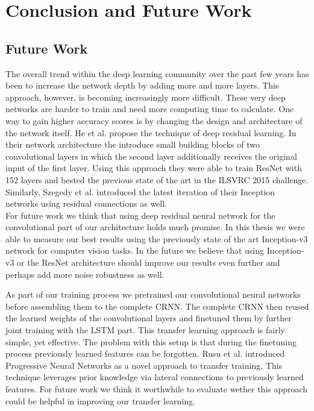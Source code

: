 \section{Conclusion and Future Work}
\label{sec:summary}

\subsection{Future Work}
The overall trend within the deep learning community over the past few years has been to increase the network depth by adding more and more layers. This approach, however, is becoming increasingly more difficult. These very deep networks are harder to train and need more computing time to calculate. One way to gain higher accuracy scores is by changing the design and architecture of the network itself. He et al. propose the technique of deep residual learning\cite{he2016deep}. In their network architecture the introduce small building blocks of two convolutional layers in which the second layer additionally receives the original input of the first layer. \cite{he2016deep} Using this approach they were able to train ResNet with 152 layers and bested the previous state of the art in the ILSVRC 2015 challenge. Similarly, Szegedy et al. introduced the latest iteration of their Inception networks using residual connections\cite{szegedy2016inception} as well.\\
For future work we think that using deep residual neural network for the convolutional part of our architecture holds much promise. In this thesis we were able to measure our best results using the previously state of the art Inception-v3 network for computer vision tasks. In the future we believe that using Inception-v3 or the ResNet architecture should improve our results even further and perhaps add more noise robustness as well.

As part of our training process we pretrained our convolutional neural networks before assembling them to the complete CRNN. The complete CRNN then reused the learned weights of the convolutional layers and finetuned them by further joint training with the LSTM part. This transfer learning approach is fairly simple, yet effective. The problem with this setup is that during the finetuning process previously learned features can be forgotten. Rusu et al. introduced Progressive Neural Networks\cite{rusu2016progressive} as a novel approach to transfer training. This technique leverages prior knowledge via lateral connections to previously learned features. For future work we think it worthwhile to evaluate wether this approach could be helpful in improving our transfer learning.

